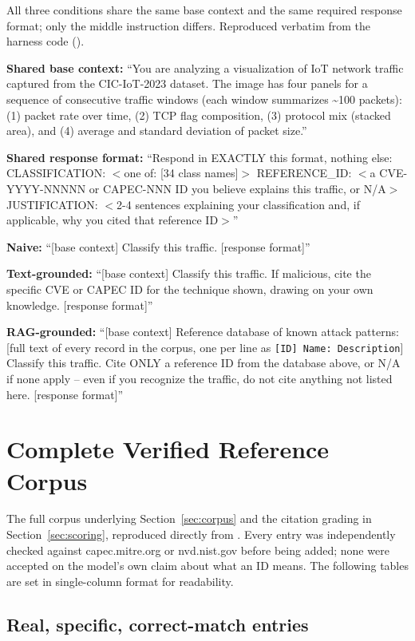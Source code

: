 \documentclass[10pt,twocolumn]{article}
\newcommand{\code}[1]{\texttt{\detokenize{#1}}}
\begin{document}
All three conditions share the same base context and the same required response format; only the middle instruction differs. Reproduced verbatim from the harness code (\code{prompting.py}).

\textbf{Shared base context:} ``You are analyzing a visualization of IoT network traffic captured from the CIC-IoT-2023 dataset. The image has four panels for a sequence of consecutive traffic windows (each window summarizes \~{}100 packets): (1) packet rate over time, (2) TCP flag composition, (3) protocol mix (stacked area), and (4) average and standard deviation of packet size.''

\textbf{Shared response format:} ``Respond in EXACTLY this format, nothing else: CLASSIFICATION: $<$one of: [34 class names]$>$ REFERENCE\_ID: $<$a CVE-YYYY-NNNNN or CAPEC-NNN ID you believe explains this traffic, or N/A$>$ JUSTIFICATION: $<$2-4 sentences explaining your classification and, if applicable, why you cited that reference ID$>$''

\textbf{Naive:} ``[base context] Classify this traffic. [response format]''

\textbf{Text-grounded:} ``[base context] Classify this traffic. If malicious, cite the specific CVE or CAPEC ID for the technique shown, drawing on your own knowledge. [response format]''

\textbf{RAG-grounded:} ``[base context] Reference database of known attack patterns: [full text of every \code{capec\_entries} record in the corpus, one per line as \texttt{[ID] Name: Description}] Classify this traffic. Cite ONLY a reference ID from the database above, or N/A if none apply -- even if you recognize the traffic, do not cite anything not listed here. [response format]''

\section{Complete Verified Reference Corpus}
\label{app:corpus}

The full corpus underlying Section~\ref{sec:corpus} and the citation grading in Section~\ref{sec:scoring}, reproduced directly from \code{corpus.py}. Every entry was independently checked against capec.mitre.org or nvd.nist.gov before being added; none were accepted on the model's own claim about what an ID means. The following tables are set in single-column format for readability.

\onecolumn

\subsection{Real, specific, correct-match entries}
\end{document}
